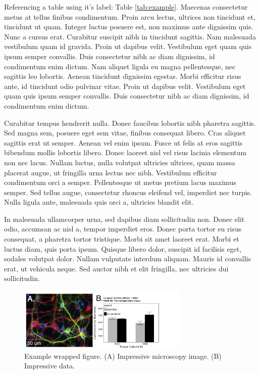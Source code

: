 Referencing a table using it's label: Table \ref{tab:example}. Maecenas consectetur metus at tellus finibus condimentum. Proin arcu lectus, ultrices non tincidunt et, tincidunt ut quam. Integer luctus posuere est, non maximus ante dignissim quis. Nunc a cursus erat. Curabitur suscipit nibh in tincidunt sagittis. Nam malesuada vestibulum quam id gravida. Proin ut dapibus velit. Vestibulum eget quam quis ipsum semper convallis. Duis consectetur nibh ac diam dignissim, id condimentum enim dictum. Nam aliquet ligula eu magna pellentesque, nec sagittis leo lobortis. Aenean tincidunt dignissim egestas. Morbi efficitur risus ante, id tincidunt odio pulvinar vitae. Proin ut dapibus velit. Vestibulum eget quam quis ipsum semper convallis. Duis consectetur nibh ac diam dignissim, id condimentum enim dictum.

Curabitur tempus hendrerit nulla. Donec faucibus lobortis nibh pharetra sagittis. Sed magna sem, posuere eget sem vitae, finibus consequat libero. Cras aliquet sagittis erat ut semper. Aenean vel enim ipsum. Fusce ut felis at eros sagittis bibendum mollis lobortis libero. Donec laoreet nisl vel risus lacinia elementum non nec lacus. Nullam luctus, nulla volutpat ultricies ultrices, quam massa placerat augue, ut fringilla urna lectus nec nibh. Vestibulum efficitur condimentum orci a semper. Pellentesque ut metus pretium lacus maximus semper. Sed tellus augue, consectetur rhoncus eleifend vel, imperdiet nec turpis. Nulla ligula ante, malesuada quis orci a, ultricies blandit elit.

In malesuada ullamcorper urna, sed dapibus diam sollicitudin non. Donec elit odio, accumsan ac nisl a, tempor imperdiet eros. Donec porta tortor eu risus consequat, a pharetra tortor tristique. Morbi sit amet laoreet erat. Morbi et luctus diam, quis porta ipsum. Quisque libero dolor, suscipit id facilisis eget, sodales volutpat dolor. Nullam vulputate interdum aliquam. Mauris id convallis erat, ut vehicula neque. Sed auctor nibh et elit fringilla, nec ultricies dui sollicitudin.

\begin{figure} %
	\includegraphics[width=8.2cm]{Figures/Fig1.jpg}
	\caption{\footnotesize Example wrapped figure. (A) Impressive microscopy image. (B) Impressive data.}
	\label{fig:example}
\end{figure}

